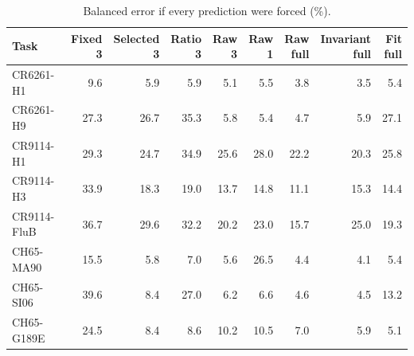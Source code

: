 \begin{table}[t]
\centering\footnotesize
\caption{Balanced error if every prediction were forced (\%).}
\setlength{\tabcolsep}{4pt}
\begin{tabular}{lrrrrrrrr}
\toprule
Task & \shortstack{Fixed\\3} & \shortstack{Selected\\3} & \shortstack{Ratio\\3} & \shortstack{Raw\\3} & \shortstack{Raw\\1} & \shortstack{Raw\\full} & \shortstack{Invariant\\full} & \shortstack{Fit\\full} \\
\midrule
CR6261-H1 & 9.6 & 5.9 & 5.9 & 5.1 & 5.5 & 3.8 & 3.5 & 5.4 \\
CR6261-H9 & 27.3 & 26.7 & 35.3 & 5.8 & 5.4 & 4.7 & 5.9 & 27.1 \\
CR9114-H1 & 29.3 & 24.7 & 34.9 & 25.6 & 28.0 & 22.2 & 20.3 & 25.8 \\
CR9114-H3 & 33.9 & 18.3 & 19.0 & 13.7 & 14.8 & 11.1 & 15.3 & 14.4 \\
CR9114-FluB & 36.7 & 29.6 & 32.2 & 20.2 & 23.0 & 15.7 & 25.0 & 19.3 \\
CH65-MA90 & 15.5 & 5.8 & 7.0 & 5.6 & 26.5 & 4.4 & 4.1 & 5.4 \\
CH65-SI06 & 39.6 & 8.4 & 27.0 & 6.2 & 6.6 & 4.6 & 4.5 & 13.2 \\
CH65-G189E & 24.5 & 8.4 & 8.6 & 10.2 & 10.5 & 7.0 & 5.9 & 5.1 \\
\bottomrule
\end{tabular}
\end{table}
